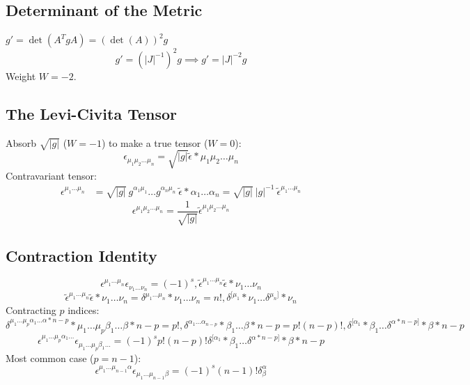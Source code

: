 \documentclass[11pt, a4paper]{report}
\begin{document}
\subsection*{Determinant of the Metric}
$g' = \det(A^T g A) = (\det(A))^2 g$
\begin{equation} g' = (|J|^{-1})^2 g \implies g' = |J|^{-2} g \end{equation}
Weight $W=-2$.

\subsection*{The Levi-Civita Tensor}
Absorb $\sqrt{|g|}$ ($W=-1$) to make a true tensor ($W=0$):
\begin{equation} \epsilon_{\mu_1\mu_2\dots\mu_n} = \sqrt{|g|} \tilde{\epsilon}*{\mu_1\mu_2\dots\mu_n} \end{equation}
Contravariant tensor:
\begin{align*}
\epsilon^{\mu_1\dots\mu_n} &= \sqrt{|g|} \ g^{\alpha_1 \mu_1}\dots g^{\alpha_n \mu_n} \ \tilde{\epsilon}*{\alpha_1\dots\alpha_n} = \sqrt{|g|} \ |g|^{-1} \ \tilde{\epsilon}^{\mu_1\dots\mu_n}
\end{align*}
\begin{equation} \epsilon^{\mu_1\mu_2\dots\mu_n} = \frac{1}{\sqrt{|g|}} \tilde{\epsilon}^{\mu_1\mu_2\dots\mu_n} \end{equation}

\subsection*{Contraction Identity}
\begin{equation} \epsilon^{\mu_1\dots\mu_n} \epsilon_{\nu_1\dots\nu_n} = (-1)^s , \tilde{\epsilon}^{\mu_1\dots\mu_n} \tilde{\epsilon}*{\nu_1\dots\nu_n} \end{equation}
\begin{equation} \tilde{\epsilon}^{\mu_1\dots\mu_n} \tilde{\epsilon}*{\nu_1\dots\nu_n} = \delta^{\mu_1\dots\mu_n}*{\nu_1\dots\nu_n} = n! , \delta^{[\mu_1}*{\nu_1} \dots \delta^{\mu_n]}*{\nu_n} \end{equation}
Contracting $p$ indices:
\begin{equation} \delta^{\mu_1\dots\mu_p \alpha_1 \dots \alpha*{n-p}}*{\mu_1\dots\mu_p \beta_1 \dots \beta*{n-p}} = p! , \delta^{\alpha_1 \dots \alpha_{n-p}}*{\beta_1 \dots \beta*{n-p}} = p!(n-p)! , \delta^{[\alpha_1}*{\beta_1} \dots \delta^{\alpha*{n-p}]}*{\beta*{n-p}} \end{equation}
\begin{equation} \epsilon^{\mu_1\dots\mu_p\alpha_1\dots} \epsilon_{\mu_1\dots\mu_p\beta_1\dots} = (-1)^s p!(n-p)! \delta^{[\alpha_1}*{\beta_1} \dots \delta^{\alpha*{n-p}]}*{\beta*{n-p}} \end{equation}
Most common case ($p=n-1$):
\begin{equation} \epsilon^{\mu_1\dots\mu_{n-1}\alpha} \epsilon_{\mu_1\dots\mu_{n-1}\beta} = (-1)^s (n-1)! \delta^\alpha_\beta \end{equation}
\end{document}
